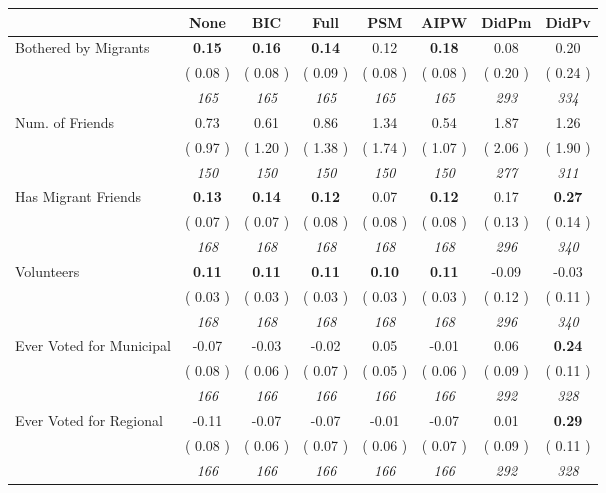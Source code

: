 \begin{tabular}{l c c c c c c c}
\toprule
 & None & BIC & Full & PSM & AIPW & DidPm & DidPv \\
\midrule
Bothered by Migrants & \textbf{      0.15 } & \textbf{      0.16 } & \textbf{      0.14 } &      0.12 & \textbf{     0.18} &      0.08 &      0.20 \\
& (     0.08 ) & (     0.08 ) & (     0.09 ) & (     0.08 ) & (     0.08 ) & (     0.20 ) & (     0.24 ) \\
& \textit{ 165 } & \textit{ 165 } & \textit{ 165 } & \textit{ 165 } & \textit{ 165 } & \textit{ 293 } & \textit{ 334 } \\
Num. of Friends &      0.73 &      0.61 &      0.86 &      1.34 &      0.54 &      1.87 &      1.26 \\
& (     0.97 ) & (     1.20 ) & (     1.38 ) & (     1.74 ) & (     1.07 ) & (     2.06 ) & (     1.90 ) \\
& \textit{ 150 } & \textit{ 150 } & \textit{ 150 } & \textit{ 150 } & \textit{ 150 } & \textit{ 277 } & \textit{ 311 } \\
Has Migrant Friends & \textbf{      0.13 } & \textbf{      0.14 } & \textbf{      0.12 } &      0.07 & \textbf{     0.12} &      0.17 & \textbf{      0.27 } \\
& (     0.07 ) & (     0.07 ) & (     0.08 ) & (     0.08 ) & (     0.08 ) & (     0.13 ) & (     0.14 ) \\
& \textit{ 168 } & \textit{ 168 } & \textit{ 168 } & \textit{ 168 } & \textit{ 168 } & \textit{ 296 } & \textit{ 340 } \\
Volunteers & \textbf{      0.11 } & \textbf{      0.11 } & \textbf{      0.11 } & \textbf{     0.10} & \textbf{     0.11} &     -0.09 &     -0.03 \\
& (     0.03 ) & (     0.03 ) & (     0.03 ) & (     0.03 ) & (     0.03 ) & (     0.12 ) & (     0.11 ) \\
& \textit{ 168 } & \textit{ 168 } & \textit{ 168 } & \textit{ 168 } & \textit{ 168 } & \textit{ 296 } & \textit{ 340 } \\
Ever Voted for Municipal &     -0.07 &     -0.03 &     -0.02 &      0.05 &     -0.01 &      0.06 & \textbf{      0.24 } \\
& (     0.08 ) & (     0.06 ) & (     0.07 ) & (     0.05 ) & (     0.06 ) & (     0.09 ) & (     0.11 ) \\
& \textit{ 166 } & \textit{ 166 } & \textit{ 166 } & \textit{ 166 } & \textit{ 166 } & \textit{ 292 } & \textit{ 328 } \\
Ever Voted for Regional &     -0.11 &     -0.07 &     -0.07 &     -0.01 &     -0.07 &      0.01 & \textbf{      0.29 } \\
& (     0.08 ) & (     0.06 ) & (     0.07 ) & (     0.06 ) & (     0.07 ) & (     0.09 ) & (     0.11 ) \\
& \textit{ 166 } & \textit{ 166 } & \textit{ 166 } & \textit{ 166 } & \textit{ 166 } & \textit{ 292 } & \textit{ 328 } \\
\bottomrule
\end{tabular}
